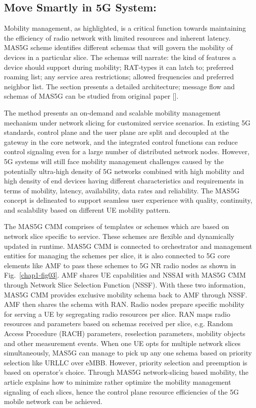 \begin{multicols}{2}
\begin{itemize}
\end{itemize}

\subsection{Move Smartly in 5G System:} 

Mobility management, as highlighted, is a critical function towards maintaining the efficiency of radio network with limited resources and inherent latency. MAS5G scheme identifies different schemas that will govern the mobility of devices in a particular slice. The schemas will narrate: the kind of features a device should support during mobility; RAT-types it can latch to; preferred roaming list; any service area restrictions; allowed frequencies  and preferred neighbor list. The section presents a detailed architecture; message flow and schemas of MAS5G can be studied from original paper [\cite{art1-key01}].

The method presents an on-demand and scalable mobility management mechanism under network slicing for customized service scenarios. In existing 5G standards, control plane and the user plane are split and decoupled at the gateway in the core network, and the integrated control functions can reduce control signaling even for a large number of distributed network nodes. However, 5G systems will still face mobility management challenges caused by the potentially ultra-high density of 5G networks combined with high mobility and high density of end devices having different characteristics and requirements in terms of mobility, latency, availability, data rates and reliability. The MAS5G concept is delineated to support seamless user experience with quality, continuity, and scalability based on different UE mobility pattern.

The MAS5G CMM comprises of templates or schemes which are based on network slice specific to service. These schemes are flexible and dynamically updated in runtime. MAS5G CMM is connected to orchestrator and management entities for managing the schemes per slice, it is also connected to 5G core elements like AMF to pass these schemes to 5G NR radio nodes as shown in Fig.~\ref{chap1-fig03}. AMF shares UE capabilities and NSSAI with MAS5G CMM through Network Slice Selection Function (NSSF). With these two information, MAS5G CMM provides exclusive mobility schema back to AMF through NSSF. AMF then shares the schema with RAN. Radio nodes prepare specific mobility for serving a UE by segregating radio resources per slice. RAN maps radio resources and parameters based on schemas received per slice, e.g. Random Access Procedure (RACH) parameters, reselection parameters, mobility objects and other measurement events. When one UE opts for multiple network slices simultaneously, MAS5G can manage to pick up any one schema based on priority selection like URLLC over eMBB. However, priority selection and preemption is based on operator’s choice. Through MAS5G network-slicing based mobility, the article explains how to minimize rather optimize the mobility management signaling of each slices, hence the control plane resource efficiencies of the 5G mobile network can be achieved. 


\end{multicols}
